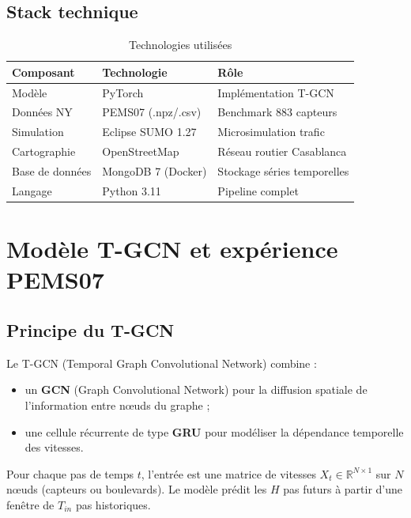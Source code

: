 \documentclass[12pt,a4paper]{report}
\begin{document}
\section{Stack technique}

\begin{table}[H]
  \centering
  \caption{Technologies utilisées}
  \label{tab:stack}
  \begin{tabular}{lll}
    \toprule
    Composant        & Technologie        & Rôle \\
    \midrule
    Modèle           & PyTorch            & Implémentation T-GCN \\
    Données NY       & PEMS07 (.npz/.csv) & Benchmark 883 capteurs \\
    Simulation       & Eclipse SUMO 1.27  & Microsimulation trafic \\
    Cartographie     & OpenStreetMap      & Réseau routier Casablanca \\
    Base de données  & MongoDB 7 (Docker) & Stockage séries temporelles \\
    Langage          & Python 3.11        & Pipeline complet \\
    \bottomrule
  \end{tabular}
\end{table}

\chapter{Modèle T-GCN et expérience PEMS07}
\label{ch:tgcn}

\section{Principe du T-GCN}

Le T-GCN (Temporal Graph Convolutional Network) combine :
\begin{itemize}
  \item un \textbf{GCN} (Graph Convolutional Network) pour la diffusion spatiale
        de l'information entre nœuds du graphe ;
  \item une cellule récurrente de type \textbf{GRU} pour modéliser la dépendance
        temporelle des vitesses.
\end{itemize}

Pour chaque pas de temps $t$, l'entrée est une matrice de vitesses
$X_t \in \mathbb{R}^{N \times 1}$ sur $N$ nœuds (capteurs ou boulevards).
Le modèle prédit les $H$ pas futurs à partir d'une fenêtre de $T_{in}$ pas
historiques.
\end{document}
